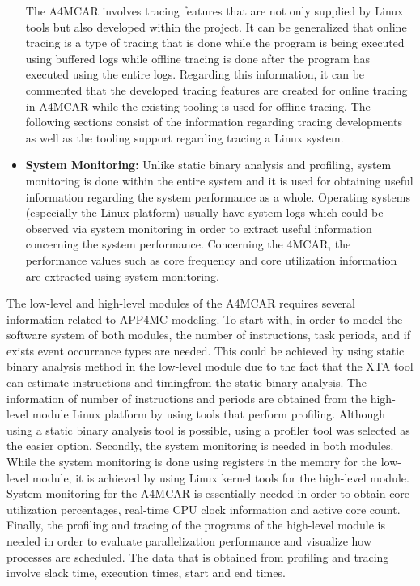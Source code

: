 \begin{itemize}
	The A4MCAR involves tracing features that are not only supplied by Linux tools but also developed within the project. It can be generalized that online tracing is a type of tracing that is done while the program is being executed using buffered logs while offline tracing is done after the program has executed using the entire logs. Regarding this information, it can be commented that the developed tracing features are created for online tracing in A4MCAR while the existing tooling is used for offline tracing. The following sections consist of the information regarding tracing developments as well as the tooling support regarding tracing a Linux system.
	\item \textbf{System Monitoring:} Unlike static binary analysis and profiling, system monitoring \cite{systemmonitoring} is done within the entire system and it is used for obtaining useful information regarding the system performance as a whole. Operating systems (especially the Linux platform) usually have system logs which could be observed via system monitoring in order to extract useful information concerning the system performance. Concerning the 4MCAR, the performance values such as core frequency and core utilization information are extracted using system monitoring.
\end{itemize}

The low-level and high-level modules of the A4MCAR requires several information related to APP4MC modeling. To start with, in order to model the software system of both modules, the number of instructions, task periods, and if exists event occurrance types are needed. This could be achieved by using static binary analysis method in the low-level module due to the fact that the XTA tool can estimate instructions and timingfrom the static binary analysis. The information of number of instructions and periods are obtained from the high-level module Linux platform by using tools that perform profiling. Although using a static binary analysis tool is possible, using a profiler tool was selected as the easier option. Secondly, the system monitoring is needed in both modules. While the system monitoring is done using registers in the memory for the low-level module, it is achieved by using Linux kernel tools for the high-level module. System monitoring for the A4MCAR is essentially needed in order to obtain core utilization percentages, real-time CPU clock information and active core count. Finally, the profiling and tracing of the programs of the high-level module is needed in order to evaluate parallelization performance and visualize how processes are scheduled. The data that is obtained from profiling and tracing involve slack time, execution times, start and end times.

